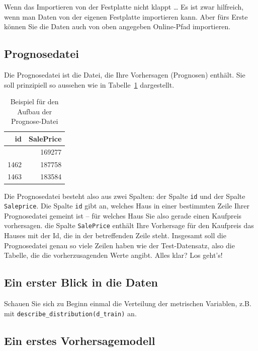 \documentclass[
  letterpaper,
  twoside,
  open=any]{scrbook}
\theoremstyle{definition}
\theoremstyle{definition}
\theoremstyle{definition}
\theoremstyle{remark}
\begin{document}
Wenn das Importieren von der Festplatte nicht klappt \ldots{} Es ist
zwar hilfreich, wenn man Daten von der eigenen Festplatte importieren
kann. Aber fürs Erste können Sie die Daten auch von oben angegeben
Online-Pfad importieren.

\subsection{Prognosedatei}\label{prognosedatei}

Die Prognosedatei ist die Datei, die Ihre Vorhersagen (Prognosen)
enthält. Sie soll prinzipiell so aussehen wie in Tabelle~\ref{tbl-subm}
dargestellt.

\begin{longtable}[]{@{}rr@{}}

\caption{\label{tbl-subm}Beispiel für den Aufbau der Prognose-Datei}

\tabularnewline

\toprule\noalign{}
id & SalePrice \\
\midrule\noalign{}
\endhead
\bottomrule\noalign{}
\endlastfoot
1461 & 169277 \\
1462 & 187758 \\
1463 & 183584 \\

\end{longtable}

Die Prognosedatei besteht also aus zwei Spalten: der Spalte \texttt{id}
und der Spalte \texttt{Saleprice}. Die Spalte \texttt{id} gibt an,
welches Haus in einer bestimmten Zeile Ihrer Prognosedatei gemeint ist
-- für welches Haus Sie also gerade einen Kaufpreis vorhersagen. die
Spalte \texttt{SalePrice} enthält Ihre Vorhersage für den Kaufpreis das
Hauses mit der Id, die in der betreffenden Zeile steht. Insgesamt soll
die Prognosedatei genau so viele Zeilen haben wie der Test-Datensatz,
also die Tabelle, die die vorherzusagenden Werte angibt. Alles klar? Los
geht's!

\subsection{Ein erster Blick in die
Daten}\label{ein-erster-blick-in-die-daten}

Schauen Sie sich zu Beginn einmal die Verteilung der metrischen
Variablen, z.B. mit \texttt{describe\_distribution(d\_train)} an.

\subsection{Ein erstes
Vorhersagemodell}\label{ein-erstes-vorhersagemodell}
\end{document}
